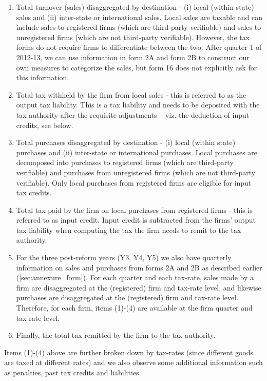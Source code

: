 \begin{enumerate}
\item Total turnover (sales) disaggregated by destination - (i) local (within state) sales and (ii) inter-state or international sales. Local sales are taxable and can include sales to registered firms (which are third-party verifiable) and sales to unregistered firms (which are not third-party verifiable). However, the tax forms do not require firms to differentiate between the two. After quarter 1 of 2012-13, we can use information in form 2A and form 2B to construct our own measures to categorize the sales, but form 16 does not explicitly ask for this information.
\item Total tax withheld by the firm from local sales - this is referred to as the output tax liability. This is a tax liability and needs to be deposited with the tax authority after the requisite adjustments -- viz. the deduction of input credits, see below.
\item Total purchases disaggregated by destination - (i) local (within state) purchases and (ii) inter-state or international purchases. Local purchases are decomposed into purchases to registered firms (which are third-party verifiable) and purchases from unregistered firms (which are not third-party verifiable). Only local purchases from registered firms are eligible for input tax credits.
\item Total tax paid by the firm on local purchases from registered  firms - this is referred to as input credit. Input credit is subtracted from the firms' output tax liability when computing the tax the firm needs to remit to the tax authority.
\item For the three post-reform years (Y3, Y4, Y5) we also have quarterly information on sales and purchases from forms 2A and 2B as described earlier (\cref{sec:annexure_form}).  For each quarter and each tax-rate, sales made by a firm are disaggregated at the (registered) firm and tax-rate level, and likewise purchases are disaggregated at the (registered) firm and tax-rate level. Therefore, for each firm, items (1)-(4) are available at the firm quarter and tax rate level.
\item Finally, the total tax remitted by the firm to the tax authority.
\end{enumerate}

Items (1)-(4) above are further broken down by tax-rates (since different goods are taxed at different rates) and we also observe some additional information such as penalties, past tax credits and liabilities. 

